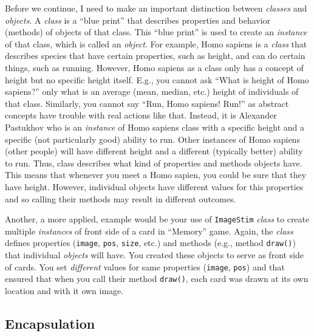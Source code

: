 \documentclass[
]{book}
\begin{document}
Before we continue, I need to make an important distinction between \emph{classes} and \emph{objects}. A \emph{class} is a ``blue print'' that describes properties and behavior (methods) of objects of that class. This ``blue print'' is used to create an \emph{instance} of that class, which is called an \emph{object}. For example, Homo sapiens is a \emph{class} that describes species that have certain properties, such as height, and can do certain things, such as running. However, Homo sapiens as a class only has a concept of height but no specific height itself. E.g., you cannot ask ``What is height of Homo sapiens?'' only what is an average (mean, median, etc.) height of individuals of that class. Similarly, you cannot say ``Run, Homo sapiens! Run!'' as abstract concepts have trouble with real actions like that. Instead, it is Alexander Pastukhov who is an \emph{instance} of Homo sapiens class with a specific height and a specific (not particularly good) ability to run. Other instances of Homo sapiens (other people) will have different height and a different (typically better) ability to run. Thus, class describes what kind of properties and methods objects have. This means that whenever you meet a Homo sapien, you could be sure that they have height. However, individual objects have different values for this properties and so calling their methods may result in different outcomes.

Another, a more applied, example would be your use of \texttt{ImageStim} \emph{class} to create multiple \emph{instances} of front side of a card in ``Memory'' game. Again, the \emph{class} defines properties (\texttt{image}, \texttt{pos}, \texttt{size}, etc.) and methods (e.g., method \texttt{draw()}) that individual \emph{objects} will have. You created these objects to serve as front side of cards. You set \emph{different} values for same properties (\texttt{image}, \texttt{pos}) and that ensured that when you call their method \texttt{draw()}, each card was drawn at its own location and with it own image.

\hypertarget{encapsulation}{%
\subsection{Encapsulation}\label{encapsulation}}
\end{document}
